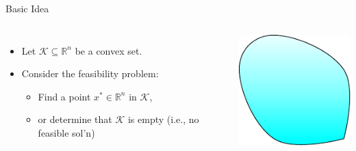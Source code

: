 \documentclass[10pt,ignorenonframetext,serif,onlymath]{beamer}
\providecommand{\tightlist}{%
  \setlength{\itemsep}{0pt}\setlength{\parskip}{0pt}}
\begin{document}
\begin{frame}{Basic Idea}
\protect\hypertarget{sec:basic-idea}{}

\begin{columns}


\begin{itemize}
\tightlist
\item
  Let \(\mathcal{K} \subseteq \mathbb{R}^n\) be a convex set.
\item
  Consider the feasibility problem:

  \begin{itemize}
  \tightlist
  \item
    Find a point \(x^* \in \mathbb{R}^n\) in \(\mathcal{K}\),
  \item
    or determine that \(\mathcal{K}\) is empty (i.e., no feasible sol’n)
  \end{itemize}
\end{itemize}


\includegraphics{ellipsoid.files/region.pdf}

\end{columns}

\end{frame}
\end{document}
